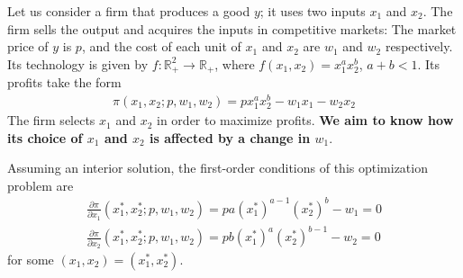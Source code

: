\documentclass[11pt]{elegantbook}
\begin{document}
\begin{example}
    Let us consider a firm that produces a good $y$; it uses two inputs $x_1$ and $x_2$. The firm sells the output and acquires the inputs in competitive markets: The market price of $y$ is $p$, and the cost of each unit of $x_1$ and $x_2$ are $w_1$ and $w_2$ respectively. Its technology is given by $f : \mathbb{R}^2_+ \rightarrow \mathbb{R}_+$, where $f (x_1, x_2) = x_1^ax_2^b$, $a + b < 1$. Its profits take the form
    \begin{equation}
        \begin{aligned}
            \pi(x_1,x_2; p, w_1,w_2)=p x_1^ax_2^b-w_1x_1-w_2x_2
        \end{aligned}
        \nonumber
    \end{equation}
    The firm selects $x_1$ and $x_2$ in order to maximize profits. \textbf{We aim to know how its choice of $x_1$ and $x_2$ is affected by a change in $w_1$}.

    Assuming an interior solution, the first-order conditions of this optimization problem are
    \begin{equation}
        \begin{aligned}
            \frac{\partial \pi}{\partial x_1}(x_1^*,x_2^*;p,w_1,w_2)=pa(x_1^*)^{a-1}(x_2^*)^b-w_1=0\\
            \frac{\partial \pi}{\partial x_2}(x_1^*,x_2^*;p,w_1,w_2)=pb(x_1^*)^{a}(x_2^*)^{b-1}-w_2=0
        \end{aligned}
        \nonumber
    \end{equation}
    for some $(x_1, x_2) = (x_1^*,x_2^*)$.


\end{example}
\end{document}
